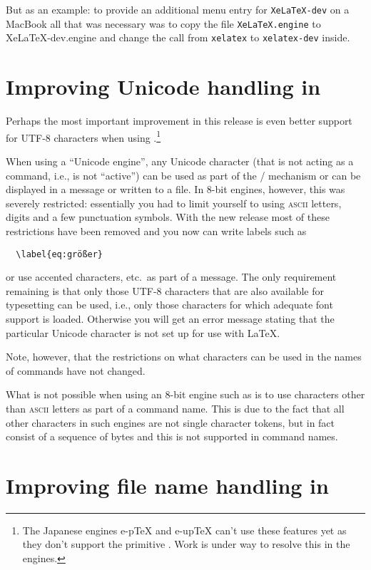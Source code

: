 \documentclass{ltnews}
\providecommand\acro[1]{\textsc{#1}}
\providecommand\pdfTeX{\hologo{pdfTeX}}
\begin{document}
But as an example: to provide an additional menu entry for
\texttt{XeLaTeX-dev} on a MacBook all that was necessary was to copy
the file \texttt{XeLaTeX.engine} to XeLaTeX-dev.engine and change the
call from \texttt{xelatex} to \texttt{xelatex-dev} inside.




\section{Improving Unicode handling in \pdfTeX{}}

Perhaps the most important improvement in this release is
even
better support for UTF-8 characters when using \pdfTeX{}.\footnote{The
  Japanese engines e-p\TeX{} and e-up\TeX{} can't use these features
  yet as they don't support the primitive . Work is
  under way to resolve this in the engines.}

When using a \enquote{Unicode engine},  
any Unicode character (that is not acting as a command, 
i.e., is not \enquote{active}) 
can be used as part of the
/ mechanism or can be displayed in a message or
written to a file. In 8-bit engines, however, this was severely
restricted: 
essentially you had to limit yourself to using
\acro{ascii} letters, digits and a few punctuation symbols.  With the
new release most of these restrictions have been removed and you now
can write labels such as
\begin{verbatim}
  \label{eq:größer}
\end{verbatim}
or use accented characters, etc.\ as part of a  message.
The only requirement remaining is that only those UTF-8 characters
that are also available for typesetting can be used, i.e., only those
characters for  
which adequate font support is loaded. Otherwise you will get an
error message stating that 
the 
particular Unicode character is not set
up for use with \LaTeX{}.

Note, however, that the restrictions on what characters can be 
used in the names of commands have not changed. 

What is not possible when using 
an 8-bit engine such as \pdfTeX{} is to use
characters other than \acro{ascii} letters as part of a command
name. This is due to the fact that all other characters in such
engines are not single character tokens, but in fact consist of a
sequence of bytes and this is not supported in command names.

\section{Improving file name handling in \pdfTeX{}}
\end{document}
